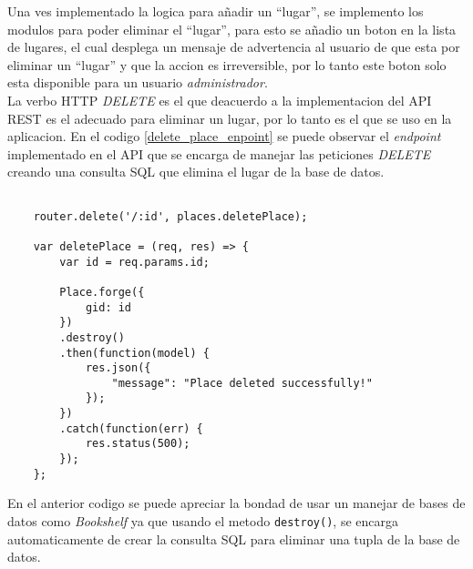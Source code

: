 Una ves implementado la logica para añadir un ``lugar'', se implemento los modulos para poder eliminar el ``lugar'', para esto se añadio un boton en la lista de lugares, el cual desplega un mensaje de advertencia al usuario de que esta por eliminar un ``lugar'' y que la accion es irreversible, por lo tanto este boton solo esta disponible para un usuario \emph{administrador}. \\

La verbo  HTTP \emph{DELETE} es el que deacuerdo a la implementacion del API REST es el adecuado para eliminar un lugar, por lo tanto es el que se uso en la aplicacion. En el codigo \ref{delete_place_enpoint} se puede observar el \emph{endpoint} implementado en el API que se encarga de manejar las peticiones \emph{DELETE} creando una consulta SQL que elimina el lugar de la base de datos.\\

\begin{center}
  \begin{lstlisting}[label=delete_place_enpoint,caption=DELETE request elimina un lugar.]

    router.delete('/:id', places.deletePlace);

    var deletePlace = (req, res) => {
        var id = req.params.id;

        Place.forge({
            gid: id
        })
        .destroy()
        .then(function(model) {
            res.json({
                "message": "Place deleted successfully!"
            });
        })
        .catch(function(err) {
            res.status(500);
        });
    };

  \end{lstlisting}
\end{center}

En el anterior codigo se puede apreciar la bondad de usar un manejar de bases de datos como \emph{Bookshelf} ya que usando el metodo \verb|destroy()|, se encarga automaticamente de crear la consulta SQL para eliminar una tupla de la base de datos.\\
